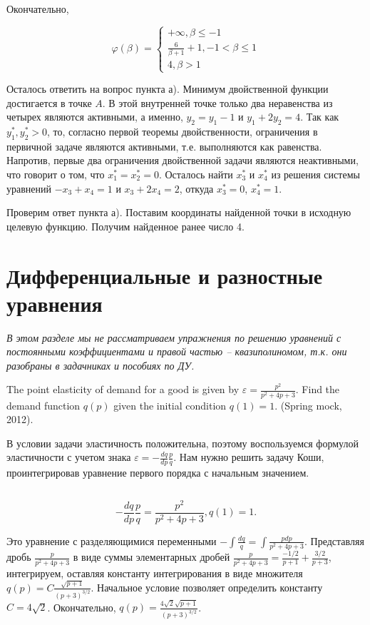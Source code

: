 \begin{solution}
Окончательно,  

\[\varphi (\beta )=\left\{\begin{array}{l} {+\infty , \beta \le -1} \\ {\frac{6}{\beta +1} +1, -1<\beta \le 1} \\ {4, \beta >1} \end{array}\right. \] 

Осталось ответить на вопрос пункта а). Минимум двойственной функции достигается в точке $A$. В этой внутренней точке только два неравенства из четырех являются активными, а именно, $y_{2} =y_{1} -1$ и $y_{1} +2y_{2} =4$. Так как $y_{1}^{*} , y_{2}^{*} >0$, то, согласно первой теоремы двойственности, ограничения в первичной задаче являются активными, т.е. выполняются как равенства. Напротив, первые два ограничения двойственной задачи являются неактивными, что говорит о том, что $x_{1}^{*} =x_{2}^{*} =0$. Осталось найти $x_{3}^{*} $ и $x_{4}^{*} $ из решения системы уравнений $-x_{3} +x_{4} =1$ и $x_{3} +2x_{4} =2$, откуда $x_{3}^{*} =0$, $x_{4}^{*} =1$.

Проверим ответ пункта а). Поставим координаты найденной точки в исходную целевую функцию. Получим найденное ранее число 4.
\end{solution}




\section{Дифференциальные и разностные уравнения}

\textit{В этом разделе мы не рассматриваем упражнения по решению уравнений с постоянными коэффициентами и правой частью -- квазиполиномом, т.к. они разобраны в задачниках и пособиях по ДУ.}

\begin{problem}
The point elasticity of demand for a good is given by $\varepsilon =\frac{p^{2} }{p^{2} +4p+3} $. Find the demand function $q(p)$ given the initial condition $q(1)=1$. (Spring mock, 2012).
\end{problem}


\begin{solution}
В условии задачи эластичность положительна, поэтому воспользуемся формулой эластичности с учетом знака $\varepsilon =-\frac{dq}{dp} \frac{p}{q} $. Нам нужно решить задачу Коши, проинтегрировав уравнение первого порядка с начальным значением.

$ $

\[-\frac{dq}{dp} \frac{p}{q} =\frac{p^{2} }{p^{2} +4p+3} , q(1)=1.\] 

Это уравнение с разделяющимися переменными $-\int \frac{dq}{q} =\int \frac{pdp}{p^{2} +4p+3}   $. Представляя дробь $\frac{p}{p^{2} +4p+3} $ в виде суммы элементарных дробей $\frac{p}{p^{2} +4p+3} =\frac{-1/2}{p+1} +\frac{3/2}{p+3} $, интегрируем, оставляя константу интегрирования в виде множителя $q(p)=C\frac{\sqrt{p+1} }{(p+3)^{3/2} } $. Начальное условие позволяет определить константу $C=4\sqrt{2} $. Окончательно, $q(p)=\frac{4\sqrt{2} \sqrt{p+1} }{(p+3)^{3/2} } $.
\end{solution}

